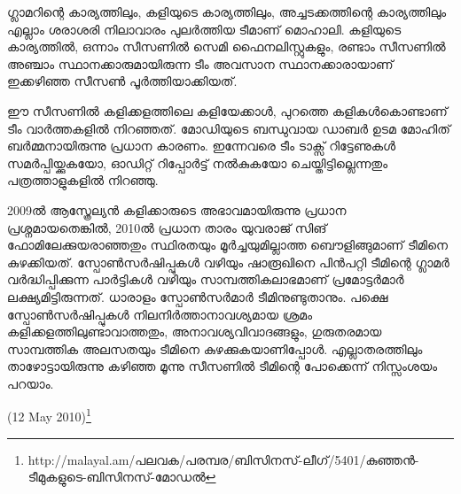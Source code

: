 ഗ്ലാമറിന്റെ കാര്യത്തിലും, കളിയുടെ കാര്യത്തിലും, അച്ചടക്കത്തിന്റെ കാര്യത്തിലും എല്ലാം ശരാശരി നിലാവാരം പുലര്‍ത്തിയ 
ടീമാണ് മൊഹാലി. കളിയുടെ കാര്യത്തില്‍, ഒന്നാം സീസണില്‍ സെമി ഫൈനലിസ്റ്റുകളും, രണ്ടാം സീസണില്‍ അഞ്ചാം 
സ്ഥാനക്കാരുമായിരുന്ന ടീം അവസാന സ്ഥാനക്കാരായാണ് ഇക്കഴിഞ്ഞ സീസണ്‍ പൂര്‍ത്തിയാക്കിയത്.

ഈ സീസണില്‍ കളിക്കളത്തിലെ കളിയേക്കാള്‍, പുറത്തെ കളികള്‍കൊണ്ടാണ് ടീം വാര്‍ത്തകളില്‍ നിറഞ്ഞത്. 
മോഡിയുടെ ബന്ധുവായ ഡാബര്‍ ഉടമ മോഹിത് ബര്‍മ്മനായിരുന്നു പ്രധാന കാരണം. ഇന്നേവരെ ടീം ടാക്സ് റിട്ടേണുകള്‍ 
സമര്‍പ്പിയ്ക്കുകയോ, ഓഡിറ്റ് റിപ്പോര്‍ട്ട് നല്‍കുകയോ ചെയ്തിട്ടില്ലെന്നതും പത്രത്താളുകളില്‍ നിറഞ്ഞു.

2009ല്‍ ആസ്ത്രേല്യന്‍ കളിക്കാരുടെ അഭാവമായിരുന്നു പ്രധാന പ്രശ്നമായതെങ്കില്‍, 2010ല്‍ പ്രധാന താരം യുവരാജ് സിങ് 
ഫോമിലേക്കുയരാഞ്ഞതും സ്ഥിരതയും മൂര്‍ച്ചയുമില്ലാത്ത ബൌളിങ്ങുമാണ് ടീമിനെ കുഴക്കിയത്. സ്പോണ്‍സര്‍ഷിപ്പുകള്‍ വഴിയും 
ഷാരൂഖിനെ പിന്‍പറ്റി ടീമിന്റെ ഗ്ലാമര്‍ വര്‍ദ്ധിപ്പിക്കുന്ന പാര്‍ട്ടികള്‍ വഴിയും സാമ്പത്തികലാഭമാണ് പ്രമോട്ടര്‍മാര്‍ ലക്ഷ്യമിട്ടിരുന്നത്. 
ധാരാളം സ്പോണ്‍സര്‍മാര്‍ ടീമിനുണ്ടുതാനും. പക്ഷെ സ്പോണ്‍സര്‍ഷിപ്പുകള്‍ നിലനിര്‍ത്താനാവശ്യമായ ശ്രമം 
കളിക്കളത്തിലുണ്ടാവാത്തതും, അനാവശ്യവിവാദങ്ങളും, ഗുരുതരമായ സാമ്പത്തിക അലസതയും ടീമിനെ കുഴക്കുകയാണിപ്പോള്‍. 
എല്ലാതരത്തിലും താഴോട്ടായിരുന്നു കഴിഞ്ഞ മൂന്നു സീസണില്‍ ടീമിന്റെ പോക്കെന്ന് നിസ്സംശയം പറയാം.

(12 May 2010)\footnote{http://malayal.am/പലവക/പരമ്പര/ബിസിനസ്-ലീഗ്/5401/കുഞ്ഞന്‍-ടീമുകളുടെ-ബിസിനസ്-മോഡല്‍}

\newpage
